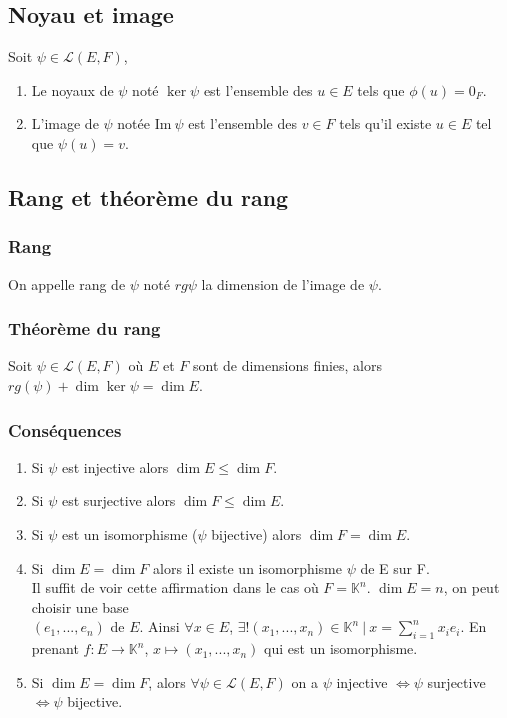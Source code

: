 \documentclass[a4paper,10pt]{book} %
\newcommand{\K}{\mathbb{K}}
\newcommand{\tq}{~|~}
\newcommand{\Ima}{\mathrm{Im}~} %
\begin{document}
\subsection{Noyau et image}
Soit $\psi \in \mathcal{L}(E,F)$,
\begin{enumerate}
\item Le noyaux de $\psi$ noté $\ker \psi$ est l'ensemble des $u\in E$ tels que $\phi(u)=0_F$.
\item L'image de $\psi$ notée $\Ima \psi$ est l'ensemble des $v\in F$ tels qu'il existe $u\in E$ tel que $\psi(u)=v$.
\end{enumerate}

\subsection{Rang et théorème du rang}
\subsubsection{Rang}
On appelle rang de $\psi$ noté $rg \psi$ la dimension de l'image de $\psi$.

\subsubsection{Théorème du rang}
Soit $\psi \in \mathcal{L}(E,F)$ où $E$ et $F$ sont de dimensions finies, alors $rg(\psi)+\dim \ker \psi=\dim E$.

\subsubsection{Conséquences}
\begin{enumerate}
\item Si $\psi$ est injective alors $\dim E\leq \dim F$.
\item Si $\psi$ est surjective alors $\dim F \leq \dim E$.
\item Si $\psi$ est un isomorphisme ($\psi$ bijective) alors $\dim F=\dim E$.
\item Si $\dim E=\dim F$ alors il existe un isomorphisme $\psi$ de E sur F.\\
Il suffit de voir cette affirmation dans le cas où $F=\K^n$. $\dim E=n$, on peut choisir une base\\
$(e_1,...,e_n)$ de $E$. Ainsi $\forall x\in E$, $\exists! (x_1,...,x_n)\in \K^n \tq x=\sum_{i=1}^nx_ie_i$. En prenant $f: E\rightarrow  \K^n$, $x\mapsto (x_1,...,x_n)$ qui est un isomorphisme.
\item Si $\dim E=\dim F$, alors $\forall \psi\in \mathcal{L}(E,F)$ on a $\psi$ injective $\Leftrightarrow \psi$ surjective $\Leftrightarrow \psi$ bijective.
\end{enumerate}
\end{document}

